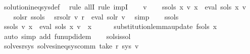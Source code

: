 \begin{isabellebody}
%
\isatagproof
{}\isamarkupfalse%
\ solution{\isacharunderscore}{\kern0pt}ineq{\isacharunderscore}{\kern0pt}sys{\isacharunderscore}{\kern0pt}def\ \isamarkupfalse%
\ {\isacharparenleft}{\kern0pt}rule\ allI{\isacharcomma}{\kern0pt}\ rule\ impI{\isacharparenright}{\kern0pt}\isanewline
\ \ \isamarkupfalse%
\ v\isanewline
\ \ \isamarkupfalse%
\ s{\isacharunderscore}{\kern0pt}sols{\isacharprime}{\kern0pt}{\isacharcolon}{\kern0pt}\ {\isachardoublequoteopen}{\isasymforall}x{\isachardot}{\kern0pt}\ v\ x\ {\isacharequal}{\kern0pt}\ eval\ {\isacharparenleft}{\kern0pt}sols{\isacharprime}{\kern0pt}\ x{\isacharparenright}{\kern0pt}\ v{\isachardoublequoteclose}\isanewline
\isanewline
\ \ \isamarkupfalse%
\ sols{\isacharprime}{\kern0pt}{\isacharunderscore}{\kern0pt}r\ s{\isacharunderscore}{\kern0pt}sols{\isacharprime}{\kern0pt}\ \isamarkupfalse%
\ s{\isacharunderscore}{\kern0pt}r{\isacharunderscore}{\kern0pt}sol{\isacharunderscore}{\kern0pt}r{\isacharcolon}{\kern0pt}\ {\isachardoublequoteopen}v\ r\ {\isacharequal}{\kern0pt}\ eval\ sol{\isacharunderscore}{\kern0pt}r\ v{\isachardoublequoteclose}\ \isamarkupfalse%
\ simp\isanewline
\ \ \isamarkupfalse%
\ s{\isacharunderscore}{\kern0pt}sols{\isacharprime}{\kern0pt}\ \isamarkupfalse%
\ s{\isacharunderscore}{\kern0pt}sols{\isacharcolon}{\kern0pt}\ {\isachardoublequoteopen}v\ x\ {\isacharequal}{\kern0pt}\ eval\ {\isacharparenleft}{\kern0pt}sols\ x{\isacharparenright}{\kern0pt}\ v{\isachardoublequoteclose}\ \ x\isanewline
\ \ \ \ \isamarkupfalse%
\ substitution{\isacharunderscore}{\kern0pt}lemma{\isacharunderscore}{\kern0pt}update{\isacharbrackleft}{\kern0pt}\ f{\isacharequal}{\kern0pt}{\isachardoublequoteopen}sols\ x{\isachardoublequoteclose}{\isacharbrackright}{\kern0pt}\ \isamarkupfalse%
\ {\isacharparenleft}{\kern0pt}auto\ simp\ add{\isacharcolon}{\kern0pt}\ fun{\isacharunderscore}{\kern0pt}upd{\isacharunderscore}{\kern0pt}idem{\isacharparenright}{\kern0pt}\isanewline
\ \ \isamarkupfalse%
\ sols{\isacharunderscore}{\kern0pt}is{\isacharunderscore}{\kern0pt}sol\ \isamarkupfalse%
\ solves{\isacharunderscore}{\kern0pt}r{\isacharunderscore}{\kern0pt}sys{\isacharcolon}{\kern0pt}\ {\isachardoublequoteopen}solves{\isacharunderscore}{\kern0pt}ineq{\isacharunderscore}{\kern0pt}sys{\isacharunderscore}{\kern0pt}comm\ {\isacharparenleft}{\kern0pt}take\ r\ sys{\isacharparenright}{\kern0pt}\ v{\isachardoublequoteclose}\isanewline

\end{isabellebody}

